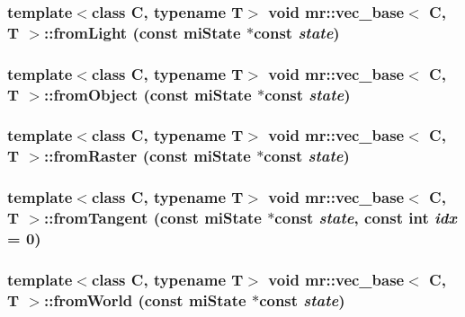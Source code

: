 \subsubsection{\setlength{\rightskip}{0pt plus 5cm}template$<$class C, typename T$>$ void {\bf mr::vec\_\-base}$<$ C, T $>$::from\-Light (const mi\-State $\ast$const {\em state})\hspace{0.3cm}{\tt  [inline]}}\label{structmr_1_1vec__base_a12}


\subsubsection{\setlength{\rightskip}{0pt plus 5cm}template$<$class C, typename T$>$ void {\bf mr::vec\_\-base}$<$ C, T $>$::from\-Object (const mi\-State $\ast$const {\em state})\hspace{0.3cm}{\tt  [inline]}}\label{structmr_1_1vec__base_a8}


\subsubsection{\setlength{\rightskip}{0pt plus 5cm}template$<$class C, typename T$>$ void {\bf mr::vec\_\-base}$<$ C, T $>$::from\-Raster (const mi\-State $\ast$const {\em state})\hspace{0.3cm}{\tt  [inline]}}\label{structmr_1_1vec__base_a11}


\subsubsection{\setlength{\rightskip}{0pt plus 5cm}template$<$class C, typename T$>$ void {\bf mr::vec\_\-base}$<$ C, T $>$::from\-Tangent (const mi\-State $\ast$const {\em state}, const int {\em idx} = 0)\hspace{0.3cm}{\tt  [inline]}}\label{structmr_1_1vec__base_a7}


\subsubsection{\setlength{\rightskip}{0pt plus 5cm}template$<$class C, typename T$>$ void {\bf mr::vec\_\-base}$<$ C, T $>$::from\-World (const mi\-State $\ast$const {\em state})\hspace{0.3cm}{\tt  [inline]}}\label{structmr_1_1vec__base_a9}



